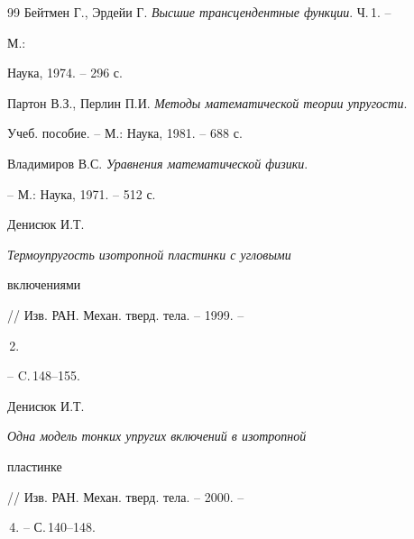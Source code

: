 \begin{thebibliography}{99}
Бейтмен Г., Эрдейи Г. {\em Высшие трансцендентные функции}. Ч.\,1. -- 


М.:  


Наука, 1974. -- 296 с. 




Партон В.З., Перлин П.И. {\em Методы математической теории упругости}. 


Учеб. пособие. -- М.: Наука, 1981. -- 688 с. 




Владимиров В.С. {\em Уравнения математической физики}. 


-- М.: Наука, 1971. -- 512 с.  




Денисюк И.Т. {\em Термоупругость изотропной пластинки с угловыми 


включениями} // Изв. РАН. Механ. тверд. тела. -- 1999. -- 


\No\,2. 


-- C.\,148--155.  




Денисюк И.Т. {\em Одна модель тонких упругих включений в изотропной  


пластинке} // Изв. РАН. Механ. тверд. тела. -- 2000. -- 


\No\,4. -- С.\,140--148. 


 


\end{thebibliography} 


 


\vskip 2cm 


 






 


\label{end} 


 


